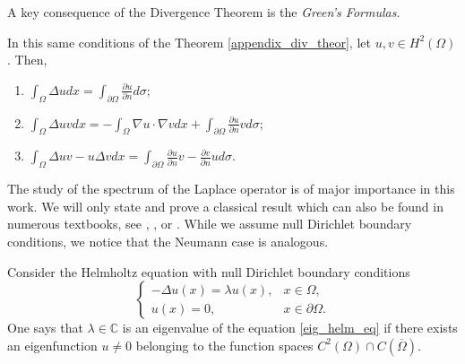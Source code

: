 A key consequence of the Divergence Theorem is the \textit{Green's Formulas}.
\begin{corollary}
    In this same conditions of the Theorem \ref{appendix_div_theor}, let \(u, v \in H^2(\Omega)\). Then,
    \begin{enumerate}
        \item \(\int_\Omega \Delta u dx = \int_{\partial \Omega} \frac{\partial u}{\partial n} d\sigma\);
        \item \(\int_\Omega \Delta u v dx = -\int_\Omega \nabla u \cdot \nabla v dx + \int_{\partial \Omega} \frac{\partial u}{\partial n}v d\sigma\);
        \item \(\int_\Omega \Delta u v - u \Delta v dx= \int_{\partial \Omega} \frac{\partial u}{\partial n}v - \frac{\partial v}{\partial n}u d\sigma\).
    \end{enumerate}
\end{corollary}

The study of the spectrum of the Laplace operator is of major importance in this work. We will only state and prove a classical result which can also be found in numerous textbooks, see \cite{brezis2011functional}, \cite{arendt2010partielle}, \cite{courant2008methods} or \cite{borthwick2020spectral}. While we assume null Dirichlet boundary conditions, we notice that the Neumann case is analogous.

\begin{definition}\label{eig_def}
    Consider the Helmholtz equation with null Dirichlet boundary conditions
    \begin{equation}\label{eig_helm_eq}
        \begin{cases}
            -\Delta u(x) = \lambda u(x), & x \in \Omega, \\
            u(x) = 0, & x \in \partial \Omega.
        \end{cases}
    \end{equation}
    One says that \(\lambda \in \mathbb{C}\) is an eigenvalue of the equation \eqref{eig_helm_eq} if there exists an eigenfunction \(u \neq 0\) belonging to the function spaces \(C^2(\Omega) \cap C(\overline{\Omega})\).
\end{definition}

